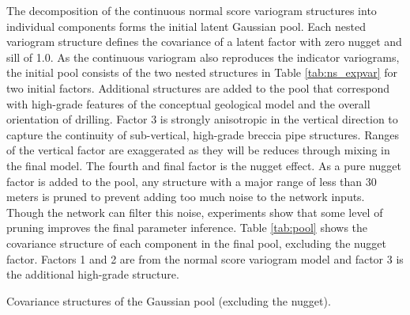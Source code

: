 The decomposition of the continuous normal score variogram structures into individual components forms the initial latent Gaussian pool. Each nested variogram structure defines the covariance of a latent factor with zero nugget and sill of 1.0. As the continuous variogram also reproduces the indicator variograms, the initial pool consists of the two nested structures in Table \ref{tab:ns_expvar} for two initial factors. Additional structures are added to the pool that correspond with high-grade features of the conceptual geological model and the overall orientation of drilling. Factor 3 is strongly anisotropic in the vertical direction to capture the continuity of sub-vertical, high-grade breccia pipe structures. Ranges of the vertical factor are exaggerated as they will be reduces through mixing in the final model. The fourth and final factor is the nugget effect. As a pure nugget factor is added to the pool, any structure with a major range of less than 30 meters is pruned to prevent adding too much noise to the network inputs. Though the network can filter this noise, experiments show that some level of pruning improves the final parameter inference. Table \ref{tab:pool} shows the covariance structure of each component in the final pool, excluding the nugget factor. Factors 1 and 2 are from the normal score variogram model and factor 3 is the additional high-grade structure.



\begin{table}[!htb]
    \centering
    \caption{Covariance structures of the Gaussian pool (excluding the nugget).}
    \resizebox{0.9\width}{!}{}
    \label{tab:pool}
\end{table}

